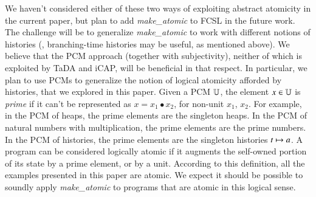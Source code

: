 We haven't considered either of these two ways of exploiting abstract
atomicity in the current paper, 
%
%
%
but plan to add \emph{make\_atomic} to FCSL in the future work. The
challenge will be to generalize \emph{make\_atomic} to work with
different notions of histories (\eg, branching-time histories may be
useful, as mentioned above). We believe that the PCM approach
(together with subjectivity), neither of which is exploited by TaDA
and iCAP, will be beneficial in that respect. In particular, we plan
to use PCMs to generalize the notion of logical atomicity afforded by
histories, that we explored in this paper. Given a PCM $\mathbb{U}$, the
element $x \in \mathbb{U}$ is \emph{prime} if it can't be represented as $x
= x_1 \bullet x_2$, for non-unit $x_1$, $x_2$. For example, in the PCM
of heaps, the prime elements are the singleton heaps. In the PCM of
natural numbers with multiplication, the prime elements are the prime
numbers. In the PCM of histories, the prime elements are the singleton
histories $t \mapsto a$. A program can be considered logically atomic if
it augments the self-owned portion of its state by a prime element, or
by a unit. According to this definition, all the examples presented in
this paper are atomic. We expect it should be possible to soundly
apply \emph{make\_atomic} to programs that are atomic in this logical
sense.

